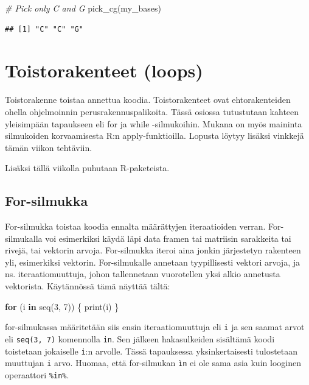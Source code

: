 \documentclass[
]{book}
\newenvironment{Shaded}{\begin{snugshade}}{\end{snugshade}}
\newcommand{\CommentTok}[1]{\textcolor[rgb]{0.56,0.35,0.01}{\textit{#1}}}
\newcommand{\ControlFlowTok}[1]{\textcolor[rgb]{0.13,0.29,0.53}{\textbf{#1}}}
\newcommand{\DecValTok}[1]{\textcolor[rgb]{0.00,0.00,0.81}{#1}}
\newcommand{\FunctionTok}[1]{\textcolor[rgb]{0.00,0.00,0.00}{#1}}
\newcommand{\NormalTok}[1]{#1}
\begin{document}
\begin{Shaded}
\begin{Highlighting}[]
\CommentTok{\# Pick only C and G}
\FunctionTok{pick\_cg}\NormalTok{(my\_bases)}
\end{Highlighting}
\end{Shaded}

\begin{verbatim}
## [1] "C" "C" "G"
\end{verbatim}

\hypertarget{loops}{%
\chapter{Toistorakenteet (loops)}\label{loops}}

Toistorakenne toistaa annettua koodia. Toistorakenteet ovat ehtorakenteiden ohella ohjelmoinnin perusrakennuspalikoita. Tässä osiossa tutustutaan kahteen yleisimpään tapaukseen eli for ja while -silmukoihin. Mukana on myös maininta silmukoiden korvaamisesta R:n apply-funktioilla. Lopusta löytyy lisäksi vinkkejä tämän viikon tehtäviin.

Lisäksi tällä viikolla puhutaan R-paketeista.

\hypertarget{for-silmukka}{%
\section{For-silmukka}\label{for-silmukka}}

For-silmukka toistaa koodia ennalta määrättyjen iteraatioiden verran. For-silmukalla voi esimerkiksi käydä läpi data framen tai matriisin sarakkeita tai rivejä, tai vektorin arvoja. For-silmukka iteroi aina jonkin järjestetyn rakenteen yli, esimerkiksi vektorin. For-silmukalle annetaan tyypillisesti vektori arvoja, ja ns. iteraatiomuuttuja, johon tallennetaan vuorotellen yksi alkio annetusta vektorista. Käytännössä tämä näyttää tältä:

\begin{Shaded}
\begin{Highlighting}[]
\ControlFlowTok{for}\NormalTok{ (i }\ControlFlowTok{in} \FunctionTok{seq}\NormalTok{(}\DecValTok{3}\NormalTok{, }\DecValTok{7}\NormalTok{)) \{}
  \FunctionTok{print}\NormalTok{(i)}
\NormalTok{\}}
\end{Highlighting}
\end{Shaded}

for-silmukassa määritetään siis ensin iteraatiomuuttuja eli \texttt{i} ja sen saamat arvot eli \texttt{seq(3,\ 7)} komennolla \texttt{in}. Sen jälkeen hakasulkeiden sisältämä koodi toistetaan jokaiselle \texttt{i}:n arvolle. Tässä tapauksessa yksinkertaisesti tulostetaan muuttujan \texttt{i} arvo. Huomaa, että for-silmukan \texttt{ìn} ei ole sama asia kuin looginen operaattori \texttt{\%in\%}.
\end{document}
